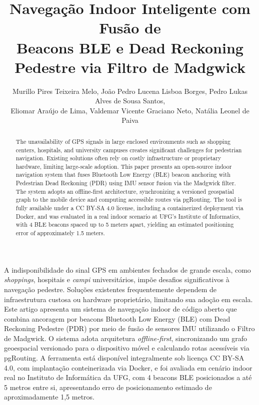 \documentclass[12pt]{article}
\title{Navegação Indoor Inteligente com Fusão de\\
       Beacons BLE e Dead Reckoning Pedestre via Filtro de Madgwick}
\author{
  Murillo Pires Teixeira Melo\inst{1},
  João Pedro Lucena Lisboa Borges\inst{1},
  Pedro Lukas Alves de Sousa Santos\inst{1},\\
  Eliomar Araújo de Lima\inst{1},
  Valdemar Vicente Graciano Neto\inst{1},
  Natália Leonel de Paiva\inst{2}
}
\begin{document}
\maketitle

\begin{abstract}
The unavailability of GPS signals in large enclosed environments such as shopping
centers, hospitals, and university campuses creates significant challenges for
pedestrian navigation. Existing solutions often rely on costly infrastructure or
proprietary hardware, limiting large-scale adoption. This paper presents an
open-source indoor navigation system that fuses Bluetooth Low Energy (BLE) beacon
anchoring with Pedestrian Dead Reckoning (PDR) using IMU sensor fusion via the
Madgwick filter. The system adopts an offline-first architecture, synchronizing
a versioned geospatial graph to the mobile device and computing accessible routes
via pgRouting. The tool is fully available under a CC BY-SA 4.0 license, including
a containerized deployment via Docker, and was evaluated in a real indoor scenario
at UFG's Institute of Informatics, with 4 BLE beacons spaced up to 5 meters apart,
yielding an estimated positioning error of approximately 1.5 meters.
\end{abstract}

\begin{resumo}
A indisponibilidade do sinal GPS em ambientes fechados de grande escala, como
\textit{shoppings}, hospitais e \textit{campi} universitários, impõe desafios
significativos à navegação pedestre. Soluções existentes frequentemente dependem
de infraestrutura custosa ou hardware proprietário, limitando sua adoção em escala.
Este artigo apresenta um sistema de navegação indoor de código aberto que combina
ancoragem por beacons Bluetooth Low Energy (BLE) com Dead Reckoning Pedestre (PDR)
por meio de fusão de sensores IMU utilizando o Filtro de Madgwick. O sistema adota
arquitetura \textit{offline-first}, sincronizando um grafo geoespacial versionado
para o dispositivo móvel e calculando rotas acessíveis via pgRouting. A ferramenta
está disponível integralmente sob licença CC BY-SA 4.0, com implantação conteinerizada
via Docker, e foi avaliada em cenário indoor real no Instituto de Informática da UFG,
com 4 beacons BLE posicionados a até 5 metros entre si, apresentando erro de
posicionamento estimado de aproximadamente 1,5 metros.
\end{resumo}
\end{document}

